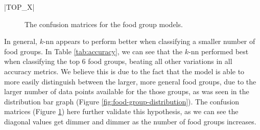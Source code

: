 \documentclass[11pt]{article}
\begin{document}
|TOP_X|
\begin{figure}[htbp]
    \centering
    \qquad
    \qquad
    \caption{The confusion matrices for the \protect{} food group models.}
    \label{fig:confusion-matrices}
\end{figure}

In general, $k$-nn appears to perform better when classifying a smaller number of food groups. In Table \ref{tab:accuracy}, we can see that the $k$-nn performed best when classifying the top 6 food groups, beating all other variations in all accuracy metrics. We believe this is due to the fact that the model is able to more easily distinguish between the larger, more general food groups, due to the larger number of data points available for the those groups, as was seen in the distribution bar graph (Figure \ref{fig:food-group-distribution}). The confusion matrices (Figure \ref{fig:confusion-matrices}) here further validate this hypothesis, as we can see the diagonal values get dimmer and dimmer as the number of food groups increases.
\end{document}
